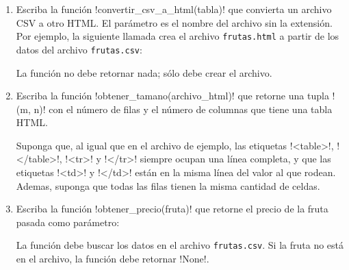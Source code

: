 \begin{enumerate}[leftmargin=0pt,label=\emph{\alph*})]

  \item
    Escriba la función \li!convertir_csv_a_html(tabla)!
    que convierta un archivo CSV a otro HTML\@.
    El parámetro es el nombre del archivo sin la extensión.
    Por ejemplo,
    la siguiente llamada crea el archivo \verb!frutas.html!
    a partir de los datos del archivo \verb!frutas.csv!:
    

    La función no debe retornar nada; sólo debe crear el archivo.

  \item
    Escriba la función \li!obtener_tamano(archivo_html)!
    que retorne una tupla \li!(m, n)!
    con el número de filas y el número de columnas
    que tiene una tabla HTML.
    

    Suponga que, al igual que en el archivo de ejemplo,
    las etiquetas \lh!<table>!, \lh!</table>!, \lh!<tr>! y \lh!</tr>!
    siempre ocupan una línea completa,
    y que las etiquetas \lh!<td>! y \lh!</td>!
    están en la misma línea del valor al que rodean.
    Ademas,
    suponga que todas las filas tienen
    la misma cantidad de celdas.

  \item
    Escriba la función \li!obtener_precio(fruta)! que
    retorne el precio de la fruta pasada como parámetro:
    

    La función debe buscar los datos en el archivo \verb!frutas.csv!.
    Si la fruta no está en el archivo,
    la función debe retornar \li!None!.

\end{enumerate}
